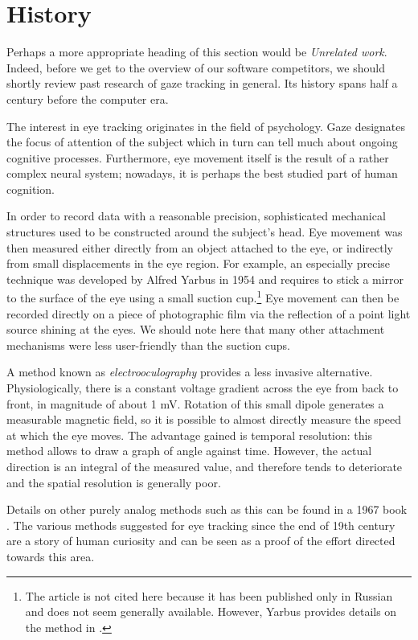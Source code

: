 \section{History}

Perhaps a more appropriate heading of this section would be \textit{Unrelated work}.
Indeed, before we get to the overview of our software competitors, we should shortly review past research of gaze tracking in general.
Its history spans half a century before the computer era.

The interest in eye tracking originates in the field of psychology.
Gaze designates the focus of attention of the subject which in turn can tell much about ongoing cognitive processes.
Furthermore, eye movement itself is the result of a rather complex neural system; nowadays, it is perhaps the best studied part of human cognition.

In order to record data with a reasonable precision, sophisticated mechanical structures used to be constructed around the subject's head.
Eye movement was then measured either directly from an object attached to the eye, or indirectly from small displacements in the eye region.
For example, an especially precise technique was developed by Alfred Yarbus in 1954 and requires to stick a mirror to the surface of the eye using a small suction cup.\footnote{
The article is not cited here because it has been published only in Russian and does not seem generally available.
However, Yarbus provides details on the method in \cite{yarbus67}.
}
Eye movement can then be recorded directly on a piece of photographic film via the reflection of a point light source shining at the eyes.
We should note here that many other attachment mechanisms were less user-friendly than the suction cups.

A method known as \textit{electrooculography} provides a less invasive alternative.
Physiologically, there is a constant voltage gradient across the eye from back to front, in magnitude of about 1 mV.
Rotation of this small dipole generates a measurable magnetic field, so it is possible to almost directly measure the speed at which the eye moves.
The advantage gained is temporal resolution: this method allows to draw a graph of angle against time.
However, the actual direction is an integral of the measured value, and therefore tends to deteriorate and the spatial resolution is generally poor.

Details on other purely analog methods such as this can be found in a 1967 book \cite{yarbus67}.
The various methods suggested for eye tracking since the end of 19th century are a story of human curiosity and can be seen as a proof of the effort directed towards this area.


